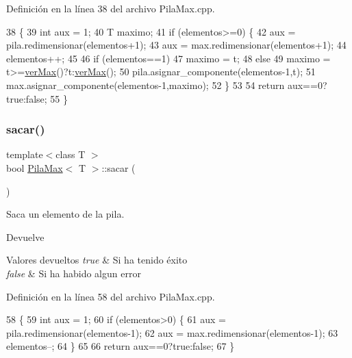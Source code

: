 Definición en la línea 38 del archivo Pila\+Max.\+cpp.


\begin{DoxyCode}
38                                     \{
39     \textcolor{keywordtype}{int} aux = 1;
40     T maximo;
41     \textcolor{keywordflow}{if} (elementos>=0) \{
42         aux = pila.redimensionar(elementos+1);
43         aux = max.redimensionar(elementos+1);
44         elementos++;
45         
46         \textcolor{keywordflow}{if} (elementos==1)
47             maximo = t;
48         \textcolor{keywordflow}{else}
49             maximo = t>=\mbox{\hyperlink{classPilaMax_a24ae04b87304dbe6640d4e28ea875990}{verMax}}()?t:\mbox{\hyperlink{classPilaMax_a24ae04b87304dbe6640d4e28ea875990}{verMax}}();        
50         pila.asignar\_componente(elementos-1,t);
51         max.asignar\_componente(elementos-1,maximo);
52     \}
53     
54     \textcolor{keywordflow}{return} aux==0?\textcolor{keyword}{true}:\textcolor{keyword}{false};
55 \}
\end{DoxyCode}
\mbox{\label{classPilaMax_a822a83071b786c454dc293635006e9ec}} 
\subsubsection{\texorpdfstring{sacar()}{sacar()}}
{\footnotesize\ttfamily template$<$class T $>$ \\
bool \mbox{\hyperlink{classPilaMax}{Pila\+Max}}$<$ T $>$\+::sacar (\begin{DoxyParamCaption}{ }\end{DoxyParamCaption})}



Saca un elemento de la pila. 

\begin{DoxyReturn}{Devuelve}

\end{DoxyReturn}

\begin{DoxyRetVals}{Valores devueltos}
{\em true} & Si ha tenido éxito \\
\hline
{\em false} & Si ha habido algun error \\
\hline
\end{DoxyRetVals}


Definición en la línea 58 del archivo Pila\+Max.\+cpp.


\begin{DoxyCode}
58                        \{    
59     \textcolor{keywordtype}{int} aux = 1;
60     \textcolor{keywordflow}{if} (elementos>0) \{
61         aux = pila.redimensionar(elementos-1);
62         aux = max.redimensionar(elementos-1);
63         elementos--;
64     \}
65     
66     \textcolor{keywordflow}{return} aux==0?\textcolor{keyword}{true}:\textcolor{keyword}{false};
67 \}
\end{DoxyCode}
\mbox{\label{classPilaMax_a24ae04b87304dbe6640d4e28ea875990}} 
